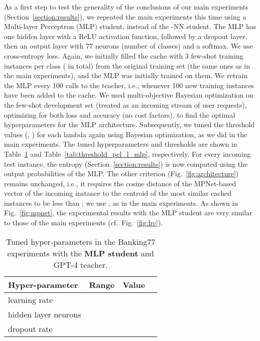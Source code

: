 \documentclass[11pt]{article}
\begin{document}
As a first step to test the generality of the conclusions of our main experiments (Section~\ref{section:results}), we repeated the main experiments this time using a Multi-layer Perceptron (MLP) student, instead of the -NN student. The MLP has one hidden 
layer with a ReLU activation function, followed by a dropout layer, then an output layer with 77 neurons (number of classes) and a softmax. We use cross-entropy loss. 
Again, we initially filled the cache with 3 few-shot training instances per class ( in total) from the original training set (the same ones as in the main experiments), and the MLP was initially trained on them. 
We retrain the MLP every 100 calls to the teacher, i.e., whenever 100 new training instances have been added to the cache. We used multi-objective Bayesian optimization on the few-shot development set (treated as an incoming stream of user requests), optimizing for both loss and accuracy (no cost factors), to find the optimal hyperparameters for the MLP architecture. Subsequently, we tuned the threshold values (, ) for each lambda again using Bayesian optimization, as we did in the main experiments. The tuned hyperparameters and thresholds are shown in Table~\ref{tab:params} and Table~\ref{tab:threshold_pel_l_mlp}, respectively.
For every incoming test instance, the entropy  (Section~\ref{section:results}) is now computed using the output probabilities of the MLP. The other criterion (Fig.~\ref{fig:architecture}) remains unchanged, i.e., it requires the cosine distance of the MPNet-based vector of the incoming instance to the centroid of the  most similar cached instances to be less than ; we use , as in the main experiments. 
As shown in Fig.~\ref{fig:mpnet}, the experimental results with the MLP student are very similar to those of the main experiments (cf.\ Fig.~\ref{fig:lrc}). 

\begin{table}[h]
\centering
{\small
  \begin{tabular}{|l|c|c|c|}
    \hline
    \textbf{Hyper-parameter} & \textbf{Range} & \textbf{Value} \\
    \hline
    learning rate &  &  \\
    hidden layer neurons &  &  \\
    dropout rate &  &  \\
    \hline
  \end{tabular}
  }
\vspace{-1mm}
\caption{Tuned hyper-parameters in the Banking77 experiments with the \textbf{MLP student} and GPT-4 teacher.}
\label{tab:params}
\end{table}
\end{document}
